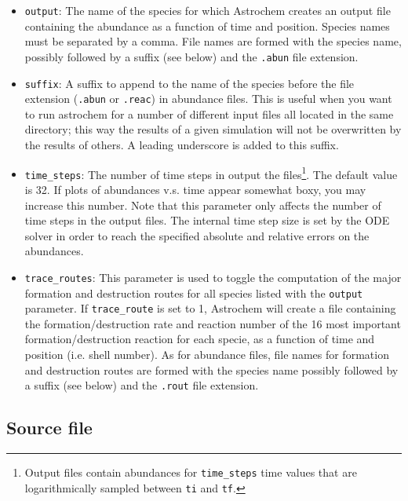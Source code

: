 \documentclass[a4paper,12pt]{article}
\begin{document}
\begin{itemize}

\item \verb=output=: The name of the species for which Astrochem
  creates an output file containing the abundance as a function of
  time and position. Species names must be separated by a comma. File
  names are formed with the species name, possibly followed by a
  suffix (see below) and the \verb=.abun= file extension.

\item \verb=suffix=: A suffix to append to the name of the species
  before the file extension (\verb=.abun= or \verb=.reac=) in
  abundance files. This is useful when you want to run astrochem for a
  number of different input files all located in the same directory;
  this way the results of a given simulation will not be overwritten
  by the results of others. A leading underscore is added to this
  suffix.

\item \verb=time_steps=: The number of time steps in output the
  files\footnote{Output files contain abundances for \verb=time_steps=
    time values that are logarithmically sampled between \verb=ti= and
    \verb=tf=.}. The default value is 32. If plots of abundances
  v.s. time appear somewhat boxy, you may increase this number. Note
  that this parameter only affects the number of time steps in the
  output files. The internal time step size is set by the ODE solver
  in order to reach the specified absolute and relative errors on the
  abundances.

\item \verb=trace_routes=: This parameter is used to toggle the
  computation of the major formation and destruction routes for all
  species listed with the \verb=output= parameter. If
  \verb=trace_route= is set to 1, Astrochem will create a file
  containing the formation/destruction rate and reaction number of the
  16 most important formation/destruction reaction for each specie, as
  a function of time and position (i.e. shell number). As for
  abundance files, file names for formation and destruction routes are
  formed with the species name possibly followed by a suffix (see
  below) and the \verb=.rout= file extension.

\end{itemize}

\subsection{Source file}
\label{sec:source-file}
\end{document}
